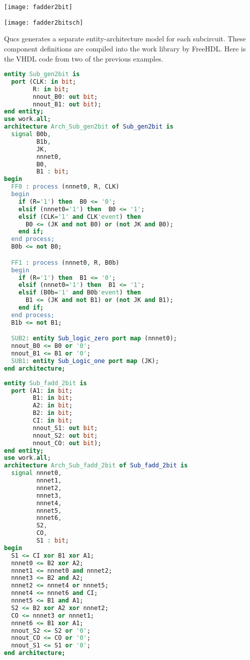 
\begin{center}
  \texttt{[image: fadder2bit]}
\end{center}
\begin{center}
  \texttt{[image: fadder2bitsch]}
\end{center}


Qucs generates a separate entity-architecture model for each
subcircuit.  These component definitions are compiled into the work
library by FreeHDL.  Here is the VHDL code from two of the previous
examples.

\begin{lstlisting}[language=VHDL]
entity Sub_gen2bit is
  port (CLK: in bit;
        R: in bit;
        nnout_B0: out bit;
        nnout_B1: out bit);
end entity;
use work.all;
architecture Arch_Sub_gen2bit of Sub_gen2bit is
  signal B0b,
         B1b,
         JK,
         nnnet0,
         B0,
         B1 : bit;
begin
  FF0 : process (nnnet0, R, CLK)
  begin
    if (R='1') then  B0 <= '0';
    elsif (nnnet0='1') then  B0 <= '1';
    elsif (CLK='1' and CLK'event) then
      B0 <= (JK and not B0) or (not JK and B0);
    end if;
  end process;
  B0b <= not B0;

  FF1 : process (nnnet0, R, B0b)
  begin
    if (R='1') then  B1 <= '0';
    elsif (nnnet0='1') then  B1 <= '1';
    elsif (B0b='1' and B0b'event) then
      B1 <= (JK and not B1) or (not JK and B1);
    end if;
  end process;
  B1b <= not B1;

  SUB2: entity Sub_logic_zero port map (nnnet0);
  nnout_B0 <= B0 or '0';
  nnout_B1 <= B1 or '0';
  SUB1: entity Sub_Logic_one port map (JK);
end architecture;
\end{lstlisting}


\begin{lstlisting}[language=VHDL]
entity Sub_fadd_2bit is
  port (A1: in bit;
        B1: in bit;
        A2: in bit;
        B2: in bit;
        CI: in bit;
        nnout_S1: out bit;
        nnout_S2: out bit;
        nnout_CO: out bit);
end entity;
use work.all;
architecture Arch_Sub_fadd_2bit of Sub_fadd_2bit is
  signal nnnet0,
         nnnet1,
         nnnet2,
         nnnet3,
         nnnet4,
         nnnet5,
         nnnet6,
         S2,
         CO,
         S1 : bit;
begin
  S1 <= CI xor B1 xor A1;
  nnnet0 <= B2 xor A2;
  nnnet1 <= nnnet0 and nnnet2;
  nnnet3 <= B2 and A2;
  nnnet2 <= nnnet4 or nnnet5;
  nnnet4 <= nnnet6 and CI;
  nnnet5 <= B1 and A1;
  S2 <= B2 xor A2 xor nnnet2;
  CO <= nnnet3 or nnnet1;
  nnnet6 <= B1 xor A1;
  nnout_S2 <= S2 or '0';
  nnout_CO <= CO or '0';
  nnout_S1 <= S1 or '0';
end architecture;
\end{lstlisting}

